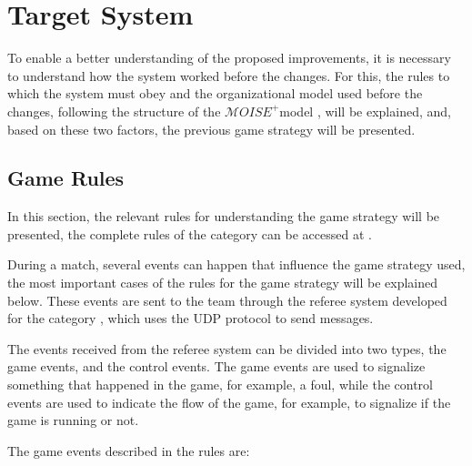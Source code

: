 \def \MOISEp {$\mathcal{M}OISE^+$}

\chapter{Target System}
\label{ch:target_system}

To enable a better understanding of the proposed improvements, it is necessary to understand how the system worked before the changes. For this, the rules to which the system must obey and the organizational model used before the changes, following the structure of the \MOISEp model \cite{MOISEp}, will be explained, and, based on these two factors, the previous game strategy will be presented.

\section{Game Rules}
\label{sec:rules}

In this section, the relevant rules for understanding the game strategy will be presented, the complete rules of the category can be accessed at \cite{RulesVSSS}.

During a match, several events can happen that influence the game strategy used, the most important cases of the rules for the game strategy will be explained below. These events are sent to the team through the referee system developed for the category \cite{VSSReferee}, which uses the UDP protocol to send messages.

The events received from the referee system can be divided into two types, the game events, and the control events. The game events are used to signalize something that happened in the game, for example, a foul, while the control events are used to indicate the flow of the game, for example, to signalize if the game is running or not.

The game events described in the rules are:

